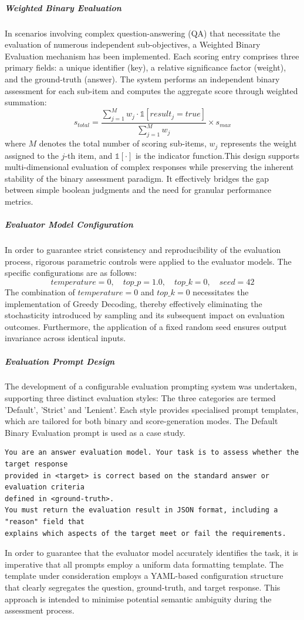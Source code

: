 \subparagraph{Weighted Binary Evaluation}

In scenarios involving complex question-answering (QA) that necessitate the evaluation of numerous independent sub-objectives, a Weighted Binary Evaluation mechanism has been implemented. Each scoring entry comprises three primary fields: a unique identifier (key), a relative significance factor (weight), and the ground-truth (answer). The system performs an independent binary assessment for each sub-item and computes the aggregate score through weighted summation:
$$
s_{total} = \frac{\sum_{j=1}^{M} w_j \cdot \mathbb{1}[result_j = true]}{\sum_{j=1}^{M} w_j} \times s_{max}
$$
where $M$ denotes the total number of scoring sub-items, $w_j$ represents the weight assigned to the $j$-th item, and $\mathbb{1}[\cdot]$ is the indicator function.This design supports multi-dimensional evaluation of complex responses while preserving the inherent stability of the binary assessment paradigm. It effectively bridges the gap between simple boolean judgments and the need for granular performance metrics.

\subparagraph{Evaluator Model Configuration}

In order to guarantee strict consistency and reproducibility of the evaluation process, rigorous parametric controls were applied to the evaluator models. The specific configurations are as follows:
$$
temperature = 0, \quad top\_p = 1.0, \quad top\_k = 0, \quad seed = 42
$$
The combination of $temperature = 0$ and $top\_k = 0$ necessitates the implementation of Greedy Decoding, thereby effectively eliminating the stochasticity introduced by sampling and its subsequent impact on evaluation outcomes. Furthermore, the application of a fixed random seed ensures output invariance across identical inputs.

\subparagraph{Evaluation Prompt Design}
The development of a configurable evaluation prompting system was undertaken, supporting three distinct evaluation styles: The three categories are termed 'Default', 'Strict' and 'Lenient'. Each style provides specialised prompt templates, which are tailored for both binary and score-generation modes. The Default Binary Evaluation prompt is used as a case study.
\begin{verbatim}
You are an answer evaluation model. Your task is to assess whether the target response 
provided in <target> is correct based on the standard answer or evaluation criteria 
defined in <ground-truth>. 
You must return the evaluation result in JSON format, including a "reason" field that 
explains which aspects of the target meet or fail the requirements.
\end{verbatim}
In order to guarantee that the evaluator model accurately identifies the task, it is imperative that all prompts employ a uniform data formatting template. The template under consideration employs a YAML-based configuration structure that clearly segregates the question, ground-truth, and target response. This approach is intended to minimise potential semantic ambiguity during the assessment process.

